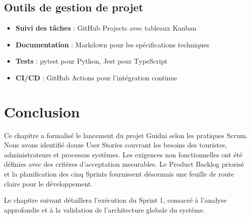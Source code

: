 \subsection{Outils de gestion de projet}

\begin{itemize}
    \item \textbf{Suivi des tâches} : GitHub Projects avec tableaux Kanban
    \item \textbf{Documentation} : Markdown pour les spécifications techniques
    \item \textbf{Tests} : pytest pour Python, Jest pour TypeScript
    \item \textbf{CI/CD} : GitHub Actions pour l'intégration continue
\end{itemize}


\section{Conclusion}

Ce chapitre a formalisé le lancement du projet Guidni selon les pratiques Scrum. Nous avons identifié douze User Stories couvrant les besoins des touristes, administrateurs et processus systèmes. Les exigences non fonctionnelles ont été définies avec des critères d'acceptation mesurables. Le Product Backlog priorisé et la planification des cinq Sprints fournissent désormais une feuille de route claire pour le développement.

Le chapitre suivant détaillera l'exécution du Sprint 1, consacré à l'analyse approfondie et à la validation de l'architecture globale du système.
